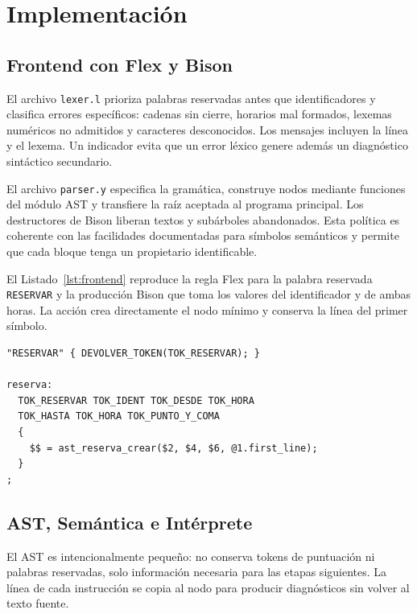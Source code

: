 \documentclass[runningheads]{llncs}
\begin{document}
\section{Implementación}

\subsection{Frontend con Flex y Bison}

El archivo \texttt{lexer.l} prioriza palabras reservadas antes que
identificadores y clasifica errores específicos: cadenas sin cierre, horarios
mal formados, lexemas numéricos no admitidos y caracteres desconocidos. Los
mensajes incluyen la línea y el lexema. Un indicador evita que un error léxico
genere además un diagnóstico sintáctico secundario.

El archivo \texttt{parser.y} especifica la gramática, construye nodos mediante
funciones del módulo AST y transfiere la raíz aceptada al programa principal.
Los destructores de Bison liberan textos y subárboles abandonados. Esta política
es coherente con las facilidades documentadas para símbolos semánticos
\cite{bison2021} y permite que cada bloque tenga un propietario identificable.

El Listado~\ref{lst:frontend} reproduce la regla Flex para la palabra reservada
\texttt{RESERVAR} y la producción Bison que toma los valores del identificador
y de ambas horas. La acción crea directamente el nodo mínimo y conserva la
línea del primer símbolo.

\begin{lstlisting}[caption={Regla Flex y producción Bison reales para una reserva.},label={lst:frontend}]
"RESERVAR" { DEVOLVER_TOKEN(TOK_RESERVAR); }

reserva:
  TOK_RESERVAR TOK_IDENT TOK_DESDE TOK_HORA
  TOK_HASTA TOK_HORA TOK_PUNTO_Y_COMA
  {
    $$ = ast_reserva_crear($2, $4, $6, @1.first_line);
  }
;
\end{lstlisting}

\subsection{AST, Semántica e Intérprete}

El AST es intencionalmente pequeño: no conserva tokens de puntuación ni
palabras reservadas, solo información necesaria para las etapas siguientes. La
línea de cada instrucción se copia al nodo para producir diagnósticos sin volver
al texto fuente.
\end{document}
